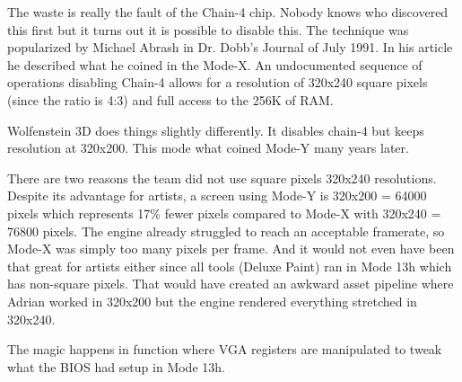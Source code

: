 \documentclass[book.tex]{subfiles}
\begin{document}
 \par
 The waste is really the fault of the Chain-4 chip. Nobody knows who discovered this first but it turns out it is possible to disable this. The technique was popularized by Michael Abrash in Dr. Dobb's Journal of July 1991. In his article he described what he coined in the Mode-X. An undocumented sequence of operations disabling Chain-4 allows for a resolution of 320x240 square pixels (since the ratio is 4:3) and full access to the 256K of RAM.\\
 \par
 Wolfenstein 3D does things slightly differently. It disables chain-4 but keeps resolution at 320x200. This mode what coined Mode-Y many years later. \\
 \par
 There are two reasons the team did not use square pixels 320x240 resolutions. Despite its advantage for artists, a screen using Mode-Y is 320x200 = 64000 pixels which represents 17\% fewer pixels compared to Mode-X with 320x240 = 76800 pixels. The engine already struggled to reach an acceptable framerate, so Mode-X was simply too many pixels per frame. And it would not even have been that great for artists either since all tools (Deluxe Paint) ran in Mode 13h which has non-square pixels. That would have created an awkward asset pipeline where Adrian worked in 320x200 but the engine rendered everything stretched in 320x240.
 \par
 \par
  \begin{minipage}{\textwidth}

\end{minipage}
 \par

The magic happens in function  where VGA registers are manipulated to tweak what the BIOS had setup in Mode 13h. \\

 \par
 \begin{minipage}{\textwidth}

\end{minipage}
\end{document}
